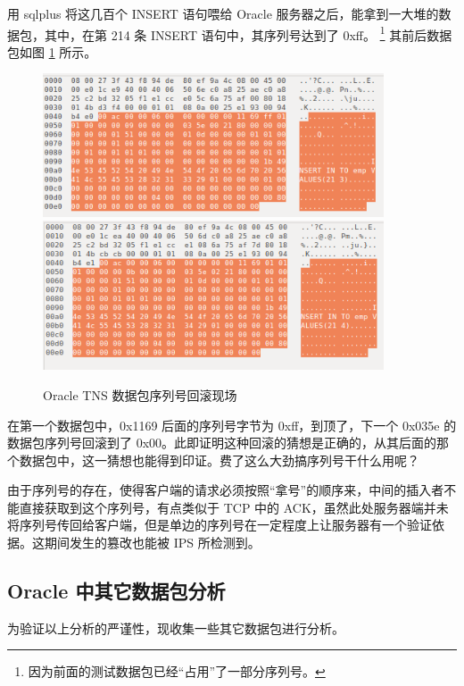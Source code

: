 用 sqlplus 将这几百个 {\cf INSERT} 语句喂给 Oracle 服务器之后，能拿到一大堆的数据包，其中，在第 214 条 {\cf INSERT} 语句中，其序列号达到了 {\cf 0xff}。
\footnote{因为前面的测试数据包已经``占用''了一部分序列号。}
其前后数据包如图 \ref{fig:tns-seq-rollback} 所示。

\begin{figure}[ht!]
    \caption{Oracle TNS 数据包序列号回滚现场}
    \label{fig:tns-seq-rollback}
    \centering
    \includegraphics[width=0.9\textwidth]{tns-seq-rollback.png}
    \includegraphics[width=0.9\textwidth]{tns-seq-rollback2.png}
\end{figure}

在第一个数据包中，{\cf 0x1169} 后面的序列号字节为 {\cf 0xff}，到顶了，下一个 {\cf 0x035e} 的数据包序列号回滚到了 {\cf 0x00}。此即证明这种回滚的猜想是正确的，从其后面的那个数据包中，这一猜想也能得到印证。费了这么大劲搞序列号干什么用呢？

由于序列号的存在，使得客户端的请求必须按照``拿号''的顺序来，中间的插入者不能直接获取到这个序列号，有点类似于 TCP 中的 ACK，虽然此处服务器端并未将序列号传回给客户端，但是单边的序列号在一定程度上让服务器有一个验证依据。这期间发生的篡改也能被 IPS 所检测到。

\subsection{Oracle 中其它数据包分析}
为验证以上分析的严谨性，现收集一些其它数据包进行分析。



